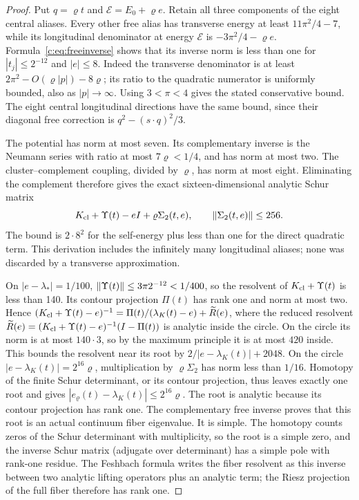 \begin{proof}
Put $q=\varrho t$ and $\mathcal E=E_0+\varrho e$. Retain all three components
of the eight central aliases. Every other free alias has transverse
energy at least $11\pi^2/4-7$, while its longitudinal denominator at
energy $\mathcal E$ is $-3\pi^2/4-\varrho e$. Formula~\eqref{c:eq:freeinverse}
shows that its inverse norm is less than one for
$|t_j|\le2^{-12}$ and $|e|\le8$. Indeed the transverse denominator is
at least $2\pi^2-O(\varrho|p|)-8\varrho$; its ratio to the
quadratic numerator is uniformly bounded, also as $|p|\to\infty$.
Using $3<\pi<4$ gives the stated conservative bound. The eight central
longitudinal directions have the same bound, since their diagonal
free correction is $q^2-(s\cdot q)^2/3$.

The potential has norm at most seven. Its complementary inverse is the
Neumann series with ratio at most $7\varrho<1/4$, and has norm at most
two. The cluster--complement coupling, divided by $\varrho$, has norm
at most eight. Eliminating the complement therefore gives the exact
sixteen-dimensional analytic Schur matrix
\begin{equation}
 K_{\rm cl}+\Upsilon(t)-eI+\varrho\Sigma_2(t,e),\qquad \left\lVert \Sigma_2(t,e)\right\rVert\le256.
                                                               \label{c:eq:feshbach}
\end{equation}
The bound is $2\cdot8^2$ for the self-energy plus less than one for
the direct quadratic term. This derivation includes the infinitely many
longitudinal aliases; none was discarded by a transverse approximation.

On $|e-\lambda_*|=1/100$,
$\left\lVert \Upsilon(t)\right\rVert\le3\pi2^{-12}<1/400$, so the resolvent of $K_{\rm cl}+\Upsilon(t)$ is
less than 140. Its contour projection $\Pi(t)$ has rank one and norm at
most two. Hence
$(K_{\rm cl}+\Upsilon(t)-e)^{-1}=\Pi(t)/(\lambda_K(t)-e)+\widetilde R(e)$, where the reduced
resolvent $\widetilde R(e)=(K_{\rm cl}+\Upsilon(t)-e)^{-1}(I-\Pi(t))$ is analytic inside
the circle. On the circle its norm is at most $140\cdot3$, so by the
maximum principle it is at most $420$ inside. This bounds the resolvent
near its root by $2/|e-\lambda_K(t)|+2048$. On the circle
$|e-\lambda_K(t)|=2^{16}\varrho$, multiplication by
$\varrho\Sigma_2$ has norm less than $1/16$. Homotopy of the finite
Schur determinant, or its contour projection, thus leaves exactly one
root and gives
$|e_\varrho(t)-\lambda_K(t)|\le2^{16}\varrho$.
The root is analytic because its contour projection has rank one.
The complementary free inverse proves that this root is an actual
continuum fiber eigenvalue. It is simple. The homotopy counts zeros of
the Schur determinant with multiplicity, so the root is a simple zero,
and the inverse Schur matrix (adjugate over determinant) has a simple
pole with rank-one residue. The Feshbach formula writes the fiber
resolvent as this inverse between two analytic lifting operators plus an
analytic term; the Riesz projection of the full fiber therefore has rank
one.


\end{proof}
